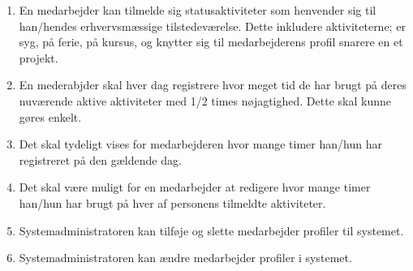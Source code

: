 \begin{enumerate}
\item En medarbejder kan tilmelde sig statusaktiviteter som henvender sig til han/hendes erhvervsmæssige tilstedeværelse. Dette inkludere aktiviteterne; er syg, på ferie, på kursus, og knytter sig til medarbejderens profil snarere en et projekt. 

\item En mederabjder skal hver dag registrere hvor meget tid de har brugt på deres nuværende aktive aktiviteter med 1/2 times nøjagtighed. Dette skal kunne gøres enkelt. 

\item Det skal tydeligt vises for medarbejderen hvor mange timer han/hun har registreret på den gældende dag.  

\item Det skal være muligt for en medarbejder at redigere hvor mange timer han/hun har brugt på hver af personens tilmeldte aktiviteter. 

\item Systemadministratoren kan tilføje og slette medarbejder profiler til systemet. 

\item Systemadministratoren kan ændre medarbejder profiler i systemet. 


\end{enumerate}


